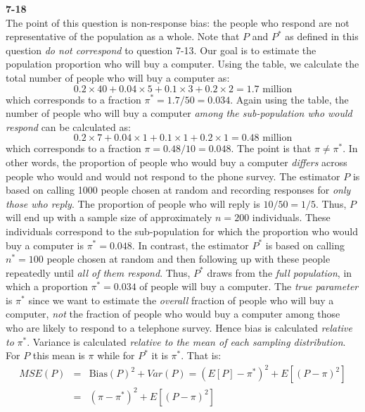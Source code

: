 \documentclass[addpoints,12pt]{exam}\usepackage[]{graphicx}\usepackage[]{color}
\begin{document}
\begin{questions}
\begin{solution}
    
    \end{solution}
  \item[]
    \begin{solution}
    \textbf{7-18}\\
    The point of this question is non-response bias: the people who respond are not representative of the population as a whole. Note that $P$ and $P^*$ as defined in this question \emph{do not correspond} to question 7-13. Our goal is to estimate the population proportion who will buy a computer. Using the table, we calculate the total number of people who will buy a computer as:
  $$0.2 \times 40 + 0.04\times 5 + 0.1\times 3 + 0.2\times 2 = 1.7 \mbox{ million}$$
which corresponds to a fraction $\pi^* = 1.7/50 = 0.034$. Again using the table, the number of people who will buy a computer \emph{among the sub-population who would respond} can be calculated as:
	$$0.2 \times 7 + 0.04\times 1 + 0.1\times 1 + 0.2\times 1 =  0.48 \mbox{ million}$$
which corresponds to a fraction $\pi = 0.48/10 = 0.048$. The point is that $\pi \neq \pi^*$. In other words, the proportion of people who would buy a computer \emph{differs} across people who would and would not respond to the phone survey. The estimator $P$ is based on calling 1000 people chosen at random and recording responses for \emph{only those who reply}. The proportion of people who will reply is $10/50 = 1/5$. Thus, $P$ will end up with a sample size of approximately $n=200$ individuals. These individuals correspond to the sub-population for which the proportion who would buy a computer is $\pi^* = 0.048$. In contrast, the estimator $P^*$ is based on calling $n^* = 100$ people chosen at random and then following up with these people repeatedly until \emph{all of them respond}. Thus, $P^*$ draws from the \emph{full population}, in which a proportion $\pi^* = 0.034$ of people will buy a computer. The \emph{true parameter} is $\pi^*$ since we want to estimate the \emph{overall} fraction of people who will buy a computer, \emph{not} the fraction of people who would buy a computer among those who are likely to respond to a telephone survey. Hence bias is calculated \emph{relative to} $\pi^*$. Variance is calculated \emph{relative to the mean of each sampling distribution}. For $P$ this mean is $\pi$ while for $P^*$ it is $\pi^*$. That is:
	\begin{eqnarray*}
		MSE(P) &=& \mbox{Bias}(P)^2 + Var(P) = (E[P] - \pi^*)^2 + E[(P - \pi)^2]\\
		&=& (\pi - \pi^*)^2 + E[(P - \pi)^2]\\

\end{eqnarray*}
\end{solution}
\end{questions}
\end{document}
